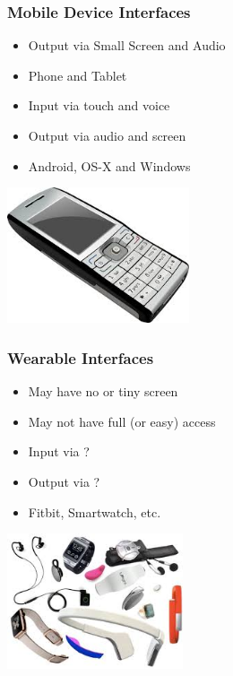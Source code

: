 \documentclass{beamer}
\begin{document}
     \begin{frame}
     	\frametitle{Mobile Device Interfaces}
     
    \begin{itemize}
    	\item  Output via Small Screen and Audio
    	\item Phone and Tablet
      
     \item Input via touch and voice
     \item Output via audio and screen
     
     \item Android, OS-X and Windows
    \end{itemize}
     
     	\includegraphics[height=4cm]{phone.jpeg}
     	
     \end{frame}

     \begin{frame}
     	\frametitle{Wearable Interfaces}
     	
     	\begin{itemize}
     		\item  May have no or tiny screen
     		\item May not have full (or easy) access
     		
     		\item Input via ?
     		
     		\item Output via ?
     		
     		\item Fitbit, Smartwatch, etc.
     	\end{itemize}
     	
     	\includegraphics[height=4cm]{wearables.jpeg}
     	
     \end{frame}
      
\end{document}

